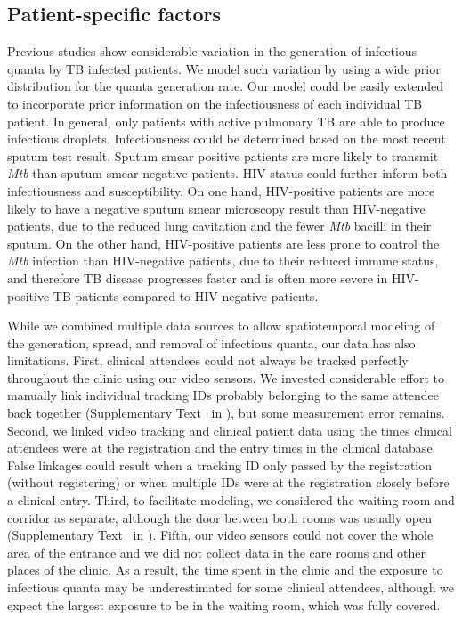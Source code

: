 \documentclass[fleqn,11pt]{wlscirep_supp}
\begin{document}
\subsection{Patient-specific factors}

Previous studies show considerable variation in the generation of infectious quanta by TB infected patients\cite{Escombe2008PLoSMed,Andrews2014JID}. We model such variation by using a wide prior distribution for the quanta generation rate. Our model could be easily extended to incorporate prior information on the infectiousness of each individual TB patient. In general, only patients with active pulmonary TB are able to produce infectious droplets\cite{Rieder1999}. Infectiousness could be determined based on the most recent sputum test result. Sputum smear positive patients are more likely to transmit \emph{Mtb} than sputum smear negative patients\cite{Shaw1954ART,Brindle1993AMRRD,Grzybowski1975BIUT}. HIV status could further inform both infectiousness and susceptibility. On one hand, HIV-positive patients are more likely to have a negative sputum smear microscopy result than HIV-negative patients, due to the reduced lung cavitation and the fewer \emph{Mtb} bacilli in their sputum\cite{Brindle1993AMRRD,Telzak1997CID}. On the other hand, HIV-positive patients are less prone to control the \emph{Mtb} infection than HIV-negative patients, due to their reduced immune status\cite{Forte1992AIDS,Kwan2011CMR,Shen1988CEI}, and therefore TB disease progresses faster and is often more severe in HIV-positive TB patients compared to HIV-negative patients. 

While we combined multiple data sources to allow spatiotemporal modeling of the generation, spread, and removal of infectious quanta, our data has also limitations. First, clinical attendees could not always be tracked perfectly throughout the clinic using our video sensors. We invested considerable effort to manually link individual tracking IDs probably belonging to the same attendee back together (Supplementary Text~ in \supp), but some measurement error remains. Second, we linked video tracking and clinical patient data using the times clinical attendees were at the registration and the entry times in the clinical database. False linkages could result when a tracking ID only passed by the registration (without registering) or when multiple IDs were at the registration closely before a clinical entry. Third, to facilitate modeling, we considered the waiting room and corridor as separate, although the door between both rooms was usually open (Supplementary Text~ in \supp). Fifth, our video sensors could not cover the whole area of the entrance and we did not collect data in the care rooms and other places of the clinic. As a result, the time spent in the clinic and the exposure to infectious quanta may be underestimated for some clinical attendees, although we expect the largest exposure to be in the waiting room, which was fully covered.   


\clearpage


\end{document}
